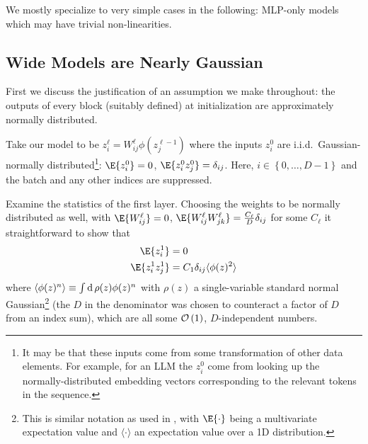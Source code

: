 We mostly specialize to very simple cases in the following: MLP-only models which may have trivial
non-linearities.


\subsection{Wide Models are Nearly Gaussian \label{app_nearly_gaussian_wide_models}}

First we discuss the justification of an assumption we make throughout: the outputs of every block
(suitably defined) at initialization are approximately normally distributed.

Take our model to be $ z ^{ \ell } _{ i } = W ^{  \ell }_{ ij } \phi \left ( z ^{ \ell -1 } _{ j }
\right ) $ where the inputs $ z ^{ 0 } _{ i } $ are i.i.d.~Gaussian-normally
distributed\footnote{It may be that these inputs come from some transformation of other data
    elements. For example, for an LLM the $ z ^{ 0 }_{ i } $ come from looking up the
    normally-distributed embedding vectors corresponding to the relevant tokens in the
sequence.}: $ \E{ z^{ 0 }_{ i }} = 0 $,  $ \E{ z ^{ 0 }_{ i }z ^{ 0 }_{ j }}
=  \delta _{ ij } $. Here, $ i \in \left \{ 0, \ldots , D-1 \right \} $ and the batch and any
other indices are suppressed.

Examine the statistics of the first layer. Choosing the weights to be normally distributed as well,
with $ \E{ W^{ \ell }_{ ij }} = 0 $,  $ \E{ W ^{ \ell }_{ ij }W ^{ \ell }_{ jk
}} = \frac{ C _{ \ell } }{ D } \delta _{ ij }$ for some $ C _{  \ell } $ it straightforward to
show that
\begin{align}
    \E{ z^{ 1 }_{ i }} &= 0 \nn
    \E{ z^{ 1 }_{ i }z^{ 1 }_{ j }} &= C _{ 1 }\delta _{ ij } \langle \phi(z )^{ 2 }\rangle
\end{align}
where  $ \langle \phi(z)^{ n }\rangle \equiv  \int  {\rm d}\, \rho(z) \phi(z)^{ n } $ with
$ \rho(z) $ a single-variable standard normal Gaussian\footnote{This is similar notation as used in
\cite{physicalDL}, with $ \E{\cdot} $ being a multivariate expectation value and $ \langle \cdot
\rangle  $ an expectation value over a 1D distribution.} (the $ D $ in the denominator was chosen to
counteract a factor of $ D $ from an index sum), which are all some $ \mathcal{O} \left( 1 \right)  $, $ D
$-independent numbers.

